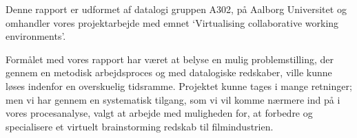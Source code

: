 Denne rapport er udformet af datalogi gruppen A302, på Aalborg Universitet og omhandler vores projektarbejde med emnet ‘Virtualising collaborative working environments’.

Formålet med vores rapport har været at belyse en mulig problemstilling, der gennem en metodisk arbejdsproces og med datalogiske redskaber, ville kunne løses indenfor en overskuelig tidsramme. Projektet kunne tages i mange retninger; men vi har gennem en systematisk tilgang, som vi vil komme nærmere ind på i vores procesanalyse, valgt at arbejde med muligheden for, at forbedre og specialisere et virtuelt brainstorming redskab til filmindustrien.
